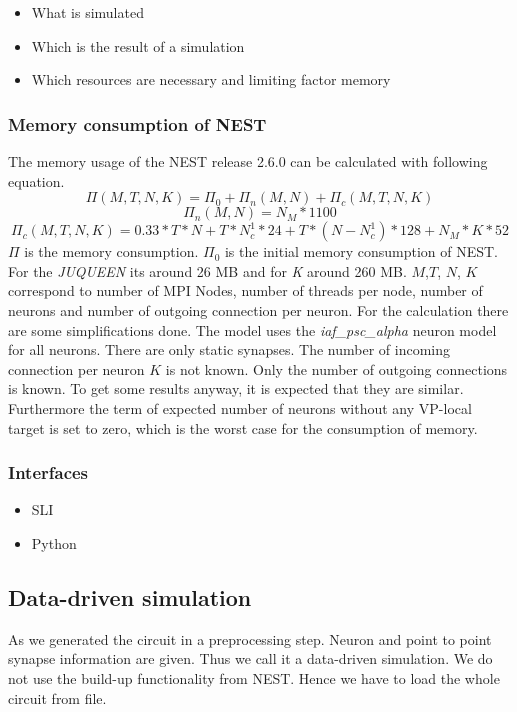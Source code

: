 \documentclass[a4paper]{article}
\begin{document}
\begin{itemize}
      \item What is simulated
      \item Which is the result of a simulation
      \item Which resources are necessary and limiting factor memory
\end{itemize}

\subsubsection{Memory consumption of NEST}
The memory usage of the NEST release 2.6.0 can be calculated with following equation. \cite{kunkel2014spiking}
\begin{equation}
  \Pi(M,T,N,K) =  \Pi_0 + \Pi_n(M,N)  + \Pi_c(M,T,N,K)
  \label{eq:NESTmemconsumption}
\end{equation} 
\begin{equation}
  \Pi_n(M,N) = N_M*1100
\end{equation}
\begin{equation}
  \Pi_c(M,T,N,K) = 0.33 * T * N + T * N^1_c * 24 + T*(N-N^1_c)*128 + N_M*K*52
\end{equation}
$\Pi$ is the memory consumption. $\Pi_0$ is the initial memory consumption of NEST.
For the \emph{JUQUEEN} its around 26 MB and for \emph{K} around 260 MB.
$M$,$T$, $N$, $K$ correspond to number of MPI Nodes, number of threads per node, number of neurons and number of outgoing connection per neuron.
For the calculation there are some simplifications done.
The model uses the \emph{iaf\_psc\_alpha} neuron model for all neurons. There are only static synapses.
The number of incoming connection per neuron $K$ is not known. Only the number of outgoing connections is known.
To get some results anyway, it is expected that they are similar.
Furthermore the term of expected number of neurons without any VP-local target is set to zero, which is the worst case for the consumption of memory.

\subsubsection{Interfaces}
\begin{itemize}
      \item SLI
      \item Python
\end{itemize}

\subsection{Data-driven simulation}
As we generated the circuit in a preprocessing step. Neuron and point to point synapse information are given.
Thus we call it a data-driven simulation. We do not use the build-up functionality from NEST.
Hence we have to load the whole circuit from file.
\end{document}
